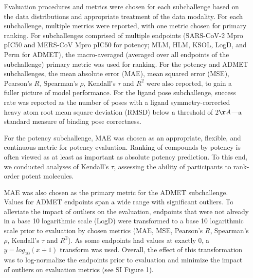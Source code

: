 \documentclass[journal=jcim,manuscript=article]{achemso}
\begin{document}
{Evaluation procedures and metrics were chosen for each subchallenge based on the data distributions and appropriate treatment of the data modality. For each subchallenge, multiple metrics were reported, with one metric chosen for primary ranking. For subchallenges comprised of multiple endpoints (SARS-CoV-2 Mpro pIC50 and MERS-CoV Mpro pIC50 for potency; MLM, HLM, KSOL, LogD, and Perm for ADMET), the macro-averaged (averaged over all endpoints of the subchallenge) primary metric was used for ranking. For the potency and ADMET subchallenges, the mean absolute error (MAE), mean squared error (MSE), Pearson's $R$, Spearman's $\rho$, Kendall's $\tau$ and $R^2$ were also reported, to gain a fuller picture of model performance. For the ligand pose subchallenge, success rate was reported as the number of poses with a ligand symmetry-corrected heavy atom root mean square deviation (RMSD) below a threshold of 2$\AA$---a standard measure of binding pose correctness.\cite{wagner_churas_liu_swift_chiu_shao_feher_burley_gilson_amaro_2019}

For the potency subchallenge, MAE was chosen as an appropriate, flexible, and continuous metric for potency evaluation. Ranking of compounds by potency is often viewed as at least as important as absolute potency prediction\cite{parks_gaieb_chiu_yang_shao_walters_jansen_mcgaughey_lewis_bembenek_et}. To this end, we conducted analyses of Kendall's $\tau$, assessing the ability of participants to rank-order potent molecules. 

MAE was also chosen as the primary metric for the ADMET subchallenge. Values for ADMET endpoints span a wide range with significant outliers. To alleviate the impact of outliers on the evaluation, endpoints that were not already in a base 10 logarithmic scale (LogD) were transformed to a base 10 logarithmic scale prior to evaluation by chosen metrics (MAE, MSE, Pearson's $R$, Spearman's $\rho$, Kendall's $\tau$ and $R^2$). As some endpoints had values at exactly 0, a $ y=log_{10}(x + 1)$ transform was used. Overall, the effect of this transformation was to log-normalize the endpoints prior to evaluation and minimize the impact of outliers on evaluation metrics (see SI Figure 1).

}
\end{document}
